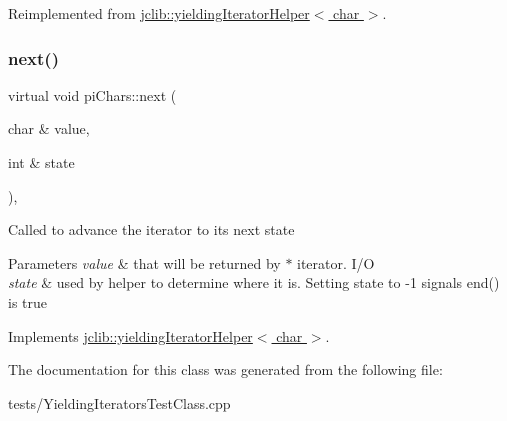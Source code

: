 Reimplemented from \hyperlink{classjclib_1_1yieldingIteratorHelper_ad3127265c429c4ac282964b7a3b261be}{jclib\+::yielding\+Iterator\+Helper$<$ char $>$}.

\mbox{\label{classpiChars_adc00b73e9ec09756b81d6da657ad5170}} 
\subsubsection{\texorpdfstring{next()}{next()}}
{\footnotesize\ttfamily virtual void pi\+Chars\+::next (\begin{DoxyParamCaption}\item[{char \&}]{value,  }\item[{int \&}]{state }\end{DoxyParamCaption})\hspace{0.3cm}{\ttfamily [inline]}, {\ttfamily [virtual]}}

Called to advance the iterator to its next state 
\begin{DoxyParams}{Parameters}
{\em value} & that will be returned by $\ast$ iterator. I/O \\
\hline
{\em state} & used by helper to determine where it is. Setting state to -\/1 signals end() is true \\
\hline
\end{DoxyParams}


Implements \hyperlink{classjclib_1_1yieldingIteratorHelper_a620c17e7eb8ed695e3fb9add01da576d}{jclib\+::yielding\+Iterator\+Helper$<$ char $>$}.



The documentation for this class was generated from the following file\+:\begin{DoxyCompactItemize}
\item 
tests/Yielding\+Iterators\+Test\+Class.\+cpp\end{DoxyCompactItemize}
